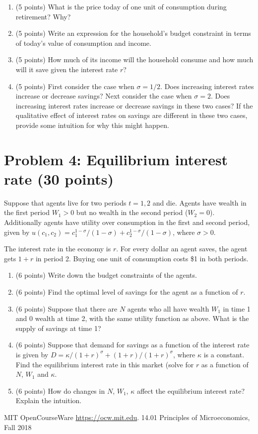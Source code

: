 \documentclass{article}
\begin{document}
\begin{enumerate}
\item (5 points) What is the price today of one unit of consumption during retirement? Why?
\item (5 points) Write an expression for the household’s budget constraint in terms of today’s value of consumption and income.
\item (5 points) How much of its income will the household consume and how much will it save given the interest rate $r$?
\item (5 points) First consider the case when $\sigma = 1/2$. Does increasing interest rates increase or decrease savings? Next consider the case when $\sigma = 2$. Does increasing interest rates increase or decrease savings in these two cases? If the qualitative eﬀect of interest rates on savings are diﬀerent in these two cases, provide some intuition for why this might happen.
\end{enumerate}

\section*{Problem 4: Equilibrium interest rate (30 points)}

Suppose that agents live for two periods $t = 1, 2$ and die. Agents have wealth in the ﬁrst period $W_1 > 0$ but no wealth in the second period ($W_2 = 0$). Additionally agents have utility over consumption in the ﬁrst and second period, given by $u(c_1, c_2) = c_1^{1-\sigma}/(1-\sigma) + c_2^{1-\sigma}/(1-\sigma)$, where $\sigma > 0$.

The interest rate in the economy is $r$. For every dollar an agent saves, the agent gets $1 + r$ in period 2. Buying one unit of consumption costs \$1 in both periods.

\begin{enumerate}
\item (6 points) Write down the budget constraints of the agents.
\item (6 points) Find the optimal level of savings for the agent as a function of $r$.
\item (6 points) Suppose that there are $N$ agents who all have wealth $W_1$ in time 1 and $0$ wealth at time 2, with the same utility function as above. What is the supply of savings at time 1?
\item (6 points) Suppose that demand for savings as a function of the interest rate is given by $D = \kappa/(1 + r)^\sigma + (1 + r)/(1 + r)^\sigma$, where $\kappa$ is a constant. Find the equilibrium interest rate in this market (solve for $r$ as a function of $N$, $W_1$ and $\kappa$.
\item (6 points) How do changes in $N$, $W_1$, $\kappa$ aﬀect the equilibrium interest rate? Explain the intuition.
\end{enumerate}

MIT OpenCourseWare \url{https://ocw.mit.edu}. 14.01 Principles of Microeconomics, Fall 2018
\end{document}

